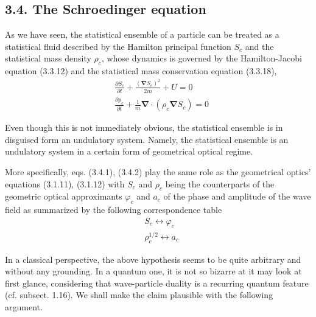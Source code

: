 \documentclass{article}
\begin{document}

\subsection*{3.4. The Schroedinger equation}

As we have seen, the statistical ensemble of a particle can be treated as a statistical fluid described by the Hamilton principal function $S_{c}$ and the statistical mass density $\rho_{c}$, whose dynamics is governed by the Hamilton-Jacobi equation (3.3.12) and the statistical mass conservation equation (3.3.18),
$$
\begin{align*}
& \frac{\partial S_{c}}{\partial t}+\frac{\left(\boldsymbol{\nabla} S_{c}\right)^{2}}{2 m}+U=0  \tag{3.4.1}\\
& \frac{\partial \rho_{c}}{\partial t}+\frac{1}{m} \boldsymbol{\nabla} \cdot\left(\rho_{c} \boldsymbol{\nabla} S_{c}\right)=0 \tag{3.4.2}
\end{align*}
$$

Even though this is not immediately obvious, the statistical ensemble is in disguised form an undulatory system. Namely,
the statistical ensemble is an undulatory system in a certain form of geometrical optical regime.

More specifically, eqs. (3.4.1), (3.4.2) play the same role as the geometrical optics' equations (3.1.11), (3.1.12) with $S_{c}$ and $\rho_{c}$ being the counterparts of the geometric optical approximants $\varphi_{c}$ and $a_{c}$ of the phase and amplitude of the wave field as summarized by the following correspondence table
$$
\begin{align*}
& S_{c} \longleftrightarrow \varphi_{c}  \tag{3.4.3}\\
& \rho_{c}^{1 / 2} \longleftrightarrow a_{c} \tag{3.4.4}
\end{align*}
$$

In a classical perspective, the above hypothesis seems to be quite arbitrary and without any grounding. In a quantum one, it is not so bizarre at it may look at first glance, considering that wave-particle duality is a recurring quantum feature (cf. subsect. 1.16). We shall make the claim plausible with the following argument.
\end{document}
